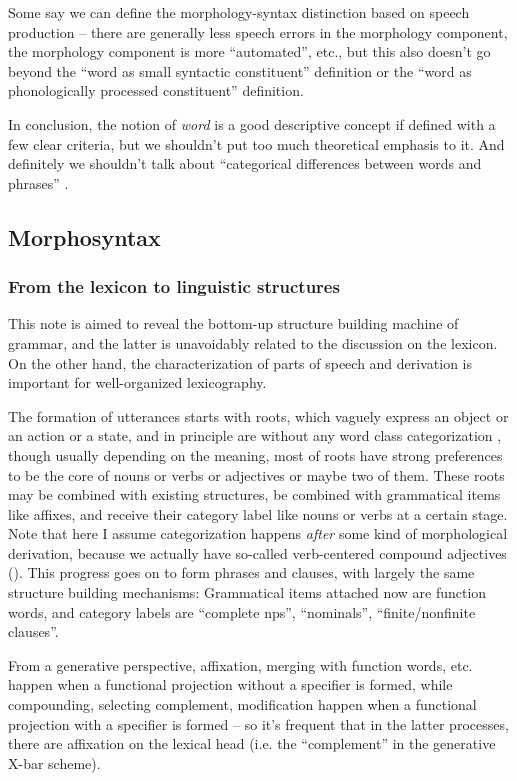 \documentclass[UTF8, a4paper, oneside, scheme=plain]{ctexrep}
\newcommand*{\citepage}[1]{pp.~{#1}}
\newcommand*{\term}[1]{\emph{#1}}
\begin{document}
Some say we can define the morphology-syntax distinction based on speech production -- 
there are generally less speech errors in the morphology component,
the morphology component is more ``automated'', etc.,
but this also doesn't go beyond the ``word as small syntactic constituent'' definition 
or the ``word as phonologically processed constituent'' definition.

In conclusion, the notion of \term{word} is a good descriptive concept
if defined with a few clear criteria,
but we shouldn't put too much theoretical emphasis to it.
And definitely we shouldn't talk about ``categorical differences between words and phrases'' 
\citep{bruening2018lexicalist}.

\subsection{Morphosyntax}

\subsubsection{From the lexicon to linguistic structures}

This note is aimed to reveal the bottom-up structure building machine of grammar,
and the latter is unavoidably related to the discussion on the lexicon.
On the other hand,
the characterization of parts of speech and derivation is important for well-organized lexicography.

The formation of utterances starts with roots, 
which vaguely express an object or an action or a state,
and in principle are without any word class categorization 
\citep[\citepage{13}]{greenough2013allen},
though usually depending on the meaning,
most of roots have strong preferences to be the core of nouns or verbs or adjectives or maybe two of them.
These roots may be combined with existing structures,
be combined with grammatical items like affixes,
and receive their category label like nouns or verbs at a certain stage.
Note that here I assume categorization happens \emph{after} some kind of morphological derivation,
because we actually have so-called verb-centered compound adjectives
().
This progress goes on to form phrases and clauses,
with largely the same structure building mechanisms:
Grammatical items attached now are function words,
and category labels are ``complete \acs{np}s'', ``nominals'', ``finite/nonfinite clauses''.

From a generative perspective, 
affixation, merging with function words, etc. 
happen when a functional projection without a specifier is formed,
while compounding, selecting complement, modification 
happen when a functional projection with a specifier is formed
-- so it's frequent that in the latter processes,
there are affixation on the lexical head (i.e. the ``complement'' in the generative X-bar scheme).
\end{document}
